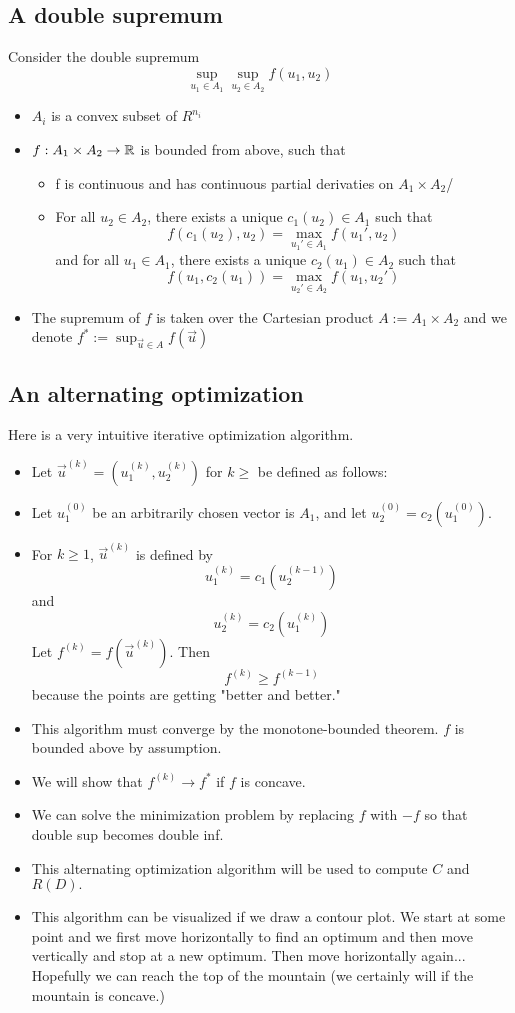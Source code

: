 \documentclass[../main.tex]{subfiles}
\begin{document}
\subsection{A double supremum}
    Consider the double supremum \[
    \sup_{u_1\in A_1}\sup_{u_2\in A_2}f(u_1,u_2)
    \]
    \begin{itemize}
        \item $A_i$ is a convex subset of $R^{n_i}$
        \item $f:A_1\times A_2\to \mathbb{R}$ is bounded from above, such that \begin{itemize}
            \item f is continuous and has continuous partial derivaties on $A_1\times A_2$/
            \item For all $u_2\in A_2$, there exists a unique $c_1(u_2)\in A_1$ such that \[
            f(c_1(u_2),u_2)=\max_{u_1'\in A_1}f(u_1',u_2)
            \] and for all $u_1\in A_1$, there exists a unique $c_2(u_1)\in A_2$ such that \[
            f(u_1,c_2(u_1))=\max_{u_2'\in A_2}f(u_1,u_2')
            \]
            \end{itemize}
        \item The supremum of $f$ is taken over the Cartesian product $A:= A_1\times A_2$ and we denote $f^*:=\sup_{\vec u\in A}f(\vec u)$
    \end{itemize}
\subsection{An alternating optimization}
Here is a very intuitive iterative optimization algorithm.
\begin{itemize}
    \item Let $\vec u^{(k)} = (u_1^(k),u_2^(k))$ for $k\geq $ be defined as follows:
    \item Let $u_1^{(0)}$ be an arbitrarily chosen vector is $A_1$, and let $u_2^{(0)}= c_2(u_1^{(0)})$.
    \item For $k\geq 1$, $\vec u^{(k)}$ is defined by \[
    u_1^{(k)}=c_1(u_2^{(k-1)})
    \] and \[
    u_2^{(k)}=c_2(u_1^{(k)})
    \]
    Let $f^{(k)}=f(\vec u^{(k)})$. 
    Then \[
    f^{(k)}\geq f^{(k-1)}
    \] because the points are getting "better and better."
\end{itemize}
\begin{itemize}
    \item This algorithm must converge by the monotone-bounded theorem. $f$ is bounded above by assumption.
    \item We will show that $f^{(k)}\to f^*$ if $f$ is concave.
    \item We can solve the minimization problem by replacing $f$ with $-f$ so that double sup becomes double inf.
    \item This alternating optimization algorithm will be used to compute $C$ and $R(D).$
    \item This algorithm can be visualized if we draw a contour plot. We start at some point and we first move horizontally to find an optimum and then move vertically and stop at a new optimum. Then move horizontally again... Hopefully we can reach the top of the mountain (we certainly will if the mountain is concave.)
\end{itemize}
\end{document}
